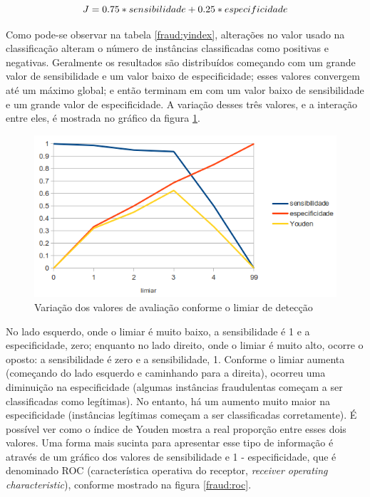 \begin{equation}
    \vspace{2mm}
    J = 0.75 * sensibilidade + 0.25 * especificidade
    \vspace{2mm}
\end{equation}

Como pode-se observar na tabela \ref{fraud:yindex}, alterações no valor usado na classificação alteram o número de instâncias classificadas como positivas e negativas. Geralmente os resultados são distribuídos começando com um grande valor de sensibilidade e um valor baixo de especificidade; esses valores convergem até um máximo global; e então terminam em com um valor baixo de sensibilidade e um grande valor de especificidade. A variação desses três valores, e a interação entre eles, é mostrada no gráfico da figura \ref{fraud:threshold}.

\begin{figure}[h!]
    \vspace{1cm}
    \centering
    \includegraphics[scale=0.5]{img/threshold.png}
    \caption{Variação dos valores de avaliação conforme o limiar de detecção}
    \label{fraud:threshold}
    \vspace{1cm}
\end{figure}

No lado esquerdo, onde o limiar é muito baixo, a sensibilidade é 1 e a especificidade, zero; enquanto no lado direito, onde o limiar é muito alto, ocorre o oposto: a sensibilidade é zero e a sensibilidade, 1. Conforme o limiar aumenta (começando do lado esquerdo e caminhando para a direita), ocorreu uma diminuição na especificidade (algumas instâncias fraudulentas começam a ser classificadas como legítimas). No entanto, há um aumento muito maior na especificidade (instâncias legítimas começam a ser classificadas corretamente). É possível ver como o índice de Youden mostra a real proporção entre esses dois valores. Uma forma mais sucinta para apresentar esse tipo de informação é através de um gráfico dos valores de sensibilidade e 1 - especificidade, que é denominado ROC (característica operativa do receptor, \emph{receiver operating characteristic}), conforme mostrado na figura \ref{fraud:roc}.

